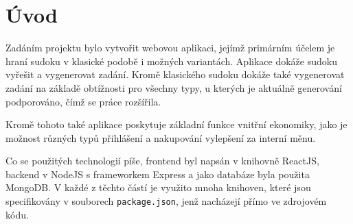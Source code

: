 \chapter*{Úvod}

Zadáním projektu bylo vytvořit webovou aplikaci, jejímž primárním účelem je hraní sudoku v klasické podobě i možných variantách. Aplikace dokáže sudoku vyřešit a vygenerovat zadání. Kromě klasického sudoku dokáže také vygenerovat zadání na základě obtížnosti pro všechny typy, u kterých je aktuálně generování podporováno, čímž se práce rozšířila.

Kromě tohoto také aplikace poskytuje základní funkce vnitřní ekonomiky, jako je možnost různých typů přihlášení a nakupování vylepšení za interní měnu.

Co se použitých technologií píše, frontend byl napsán v knihovně ReactJS, backend v NodeJS s frameworkem Express a jako databáze byla použita MongoDB. V každé z těchto částí je využito mnoha knihoven, které jsou specifikovány v souborech \texttt{package.json}, jenž nacházejí přímo ve zdrojovém kódu.